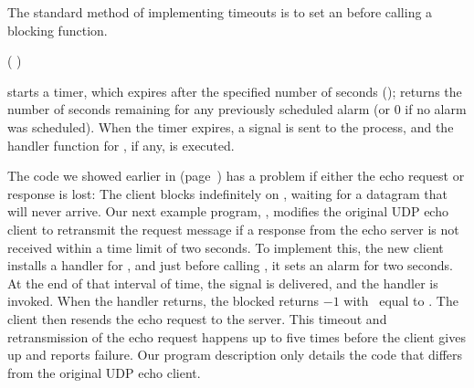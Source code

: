 The standard method of implementing timeouts
is to set an  before calling a
blocking function.

\begin{inlinefcn}
 ( )
\end{inlinefcn}

\noindent {} starts a timer, which expires after
the specified number of seconds (); 
returns the number of seconds remaining for any previously scheduled
alarm (or 0 if no alarm was scheduled).
When the timer expires, a  signal is sent
to the process, and the handler function for , if
any, is executed.

The code we showed earlier in
 (page~\pageref{code/UDPEchoClient.c}) has a problem if
either the echo request or
response is lost: The client blocks indefinitely on
, waiting for a datagram that will never
arrive.  Our next example program, , 
modifies the original UDP echo client
to retransmit the request message if a response from the
echo server is not received within a time limit of two seconds.
To implement this, the new client installs a handler for
, and just before calling
, it sets an alarm for two seconds.
At the end of that interval of time,
the  signal is delivered, and the handler
is invoked.
When the handler returns, 
the blocked  returns $-1$ with
\ equal to
. The client then resends the echo request to the
server.  This timeout and retransmission of the echo request happens
up to five times before the client gives up and reports failure.  Our
program description only details the code that differs from the original UDP
echo client. 


